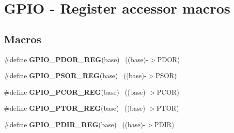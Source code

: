 \hypertarget{group___g_p_i_o___register___accessor___macros}{}\section{G\+P\+I\+O -\/ Register accessor macros}
\label{group___g_p_i_o___register___accessor___macros}
\subsection*{Macros}
\begin{DoxyCompactItemize}
\item 
\hypertarget{group___g_p_i_o___register___accessor___macros_ga737b4580bb16c01a468bc2c129e54d86}{}\#define {\bfseries G\+P\+I\+O\+\_\+\+P\+D\+O\+R\+\_\+\+R\+E\+G}(base)                                        ~((base)-\/$>$P\+D\+O\+R)\label{group___g_p_i_o___register___accessor___macros_ga737b4580bb16c01a468bc2c129e54d86}

\item 
\hypertarget{group___g_p_i_o___register___accessor___macros_ga05da33b22ee087558800c07d743c52e7}{}\#define {\bfseries G\+P\+I\+O\+\_\+\+P\+S\+O\+R\+\_\+\+R\+E\+G}(base)                                        ~((base)-\/$>$P\+S\+O\+R)\label{group___g_p_i_o___register___accessor___macros_ga05da33b22ee087558800c07d743c52e7}

\item 
\hypertarget{group___g_p_i_o___register___accessor___macros_gafeabd0beb942930229271934efc513ef}{}\#define {\bfseries G\+P\+I\+O\+\_\+\+P\+C\+O\+R\+\_\+\+R\+E\+G}(base)                                        ~((base)-\/$>$P\+C\+O\+R)\label{group___g_p_i_o___register___accessor___macros_gafeabd0beb942930229271934efc513ef}

\item 
\hypertarget{group___g_p_i_o___register___accessor___macros_ga4c1b943d4d92f73c9f08d272d8fc8fe1}{}\#define {\bfseries G\+P\+I\+O\+\_\+\+P\+T\+O\+R\+\_\+\+R\+E\+G}(base)                                        ~((base)-\/$>$P\+T\+O\+R)\label{group___g_p_i_o___register___accessor___macros_ga4c1b943d4d92f73c9f08d272d8fc8fe1}

\item 
\hypertarget{group___g_p_i_o___register___accessor___macros_gac2c9f15f5083562b4f7c2826afe2d2b6}{}\#define {\bfseries G\+P\+I\+O\+\_\+\+P\+D\+I\+R\+\_\+\+R\+E\+G}(base)                                        ~((base)-\/$>$P\+D\+I\+R)\label{group___g_p_i_o___register___accessor___macros_gac2c9f15f5083562b4f7c2826afe2d2b6}


\end{DoxyCompactItemize}
